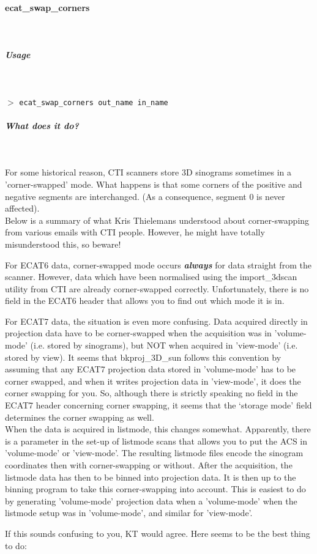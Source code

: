 \documentclass{article}
\newcommand{\subsubsubsection}[1]{\paragraph{#1}\mbox{} \\}
\newcommand{\subsubsubsubsection}[1]{\subparagraph{#1} \mbox{} \\}
\newcommand{\cmdline}[1]{\par \noindent $>$ \texttt{#1}\par}
\begin{document}
{{{\subsubsubsection{ecat\_swap\_corners}
\label{sec:ecat_swap_corners}
{ \subsubsubsubsection{Usage}
}
\cmdline{ecat\_swap\_corners out\_name in\_name}

{ \subsubsubsubsection{What does it do?}
}
For some historical reason, CTI scanners store 3D sinograms sometimes 
in a 'corner-swapped' mode. What happens is that some corners 
of the positive and negative segments are interchanged. (As a 
consequence, segment 0 is never affected).\\
Below is a summary of what Kris Thielemans understood about corner-swapping 
from various emails with CTI people. However, he might have totally 
misunderstood this, so beware!



For ECAT6 data, corner-swapped mode occurs \textbf{\textit{always}} for 
data straight from the scanner. However, data which have been 
normalised using the import\_3dscan utility from CTI are already 
corner-swapped correctly. Unfortunately, there is no field in 
the ECAT6 header that allows you to find out which mode it is 
in.



For ECAT7 data, the situation is even more confusing. Data acquired 
directly in projection data have to be corner-swapped when the 
acquisition was in 'volume-mode' (i.e. stored by sinograms), 
but NOT when acquired in 'view-mode' (i.e. stored by view). It 
seems that bkproj\_3D\_sun follows this convention by assuming 
that any ECAT7 projection data stored in 'volume-mode' has to 
be corner swapped, and when it writes projection data in 'view-mode', 
it does the corner swapping for you. So, although there is strictly 
speaking no field in the ECAT7 header concerning corner swapping, 
it seems that the `storage mode' field determines the corner swapping 
as well.\\
When the data is acquired in listmode, this changes somewhat. 
Apparently, there is a parameter in the set-up of listmode scans 
that allows you to put the ACS in 'volume-mode' or 'view-mode'. 
The resulting listmode files encode the sinogram coordinates 
then with corner-swapping or without. After the acquisition, 
the listmode data has then to be binned into projection data. 
It is then up to the binning program to take this corner-swapping 
into account. This is easiest to do by generating 'volume-mode' 
projection data when a 'volume-mode' when the listmode setup 
was in 'volume-mode', and similar for 'view-mode'.


If this sounds confusing to you, KT would agree. Here seems to 
be the best thing to do:


}}}
\end{document}
